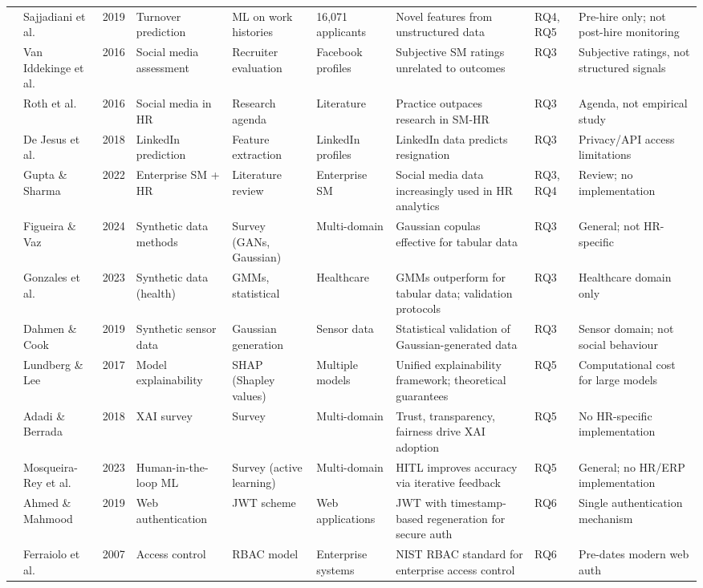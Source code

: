 \documentclass[12pt,a4paper]{article}
\begin{document}
\begin{landscape}
\begin{longtable}{C{0.4cm} L{2.0cm} C{0.6cm} L{1.8cm} L{2.2cm} L{1.8cm} L{2.8cm} C{0.9cm} L{2.8cm}}
 & Sajjadiani et al. & 2019 & Turnover prediction & ML on work histories & 16,071 applicants & Novel features from unstructured data & RQ4, RQ5 & Pre-hire only; not post-hire monitoring \\
 & Van Iddekinge et al. & 2016 & Social media assessment & Recruiter evaluation & Facebook profiles & Subjective SM ratings unrelated to outcomes & RQ3 & Subjective ratings, not structured signals \\
 & Roth et al. & 2016 & Social media in HR & Research agenda & Literature & Practice outpaces research in SM-HR & RQ3 & Agenda, not empirical study \\
 & De Jesus et al. & 2018 & LinkedIn prediction & Feature extraction & LinkedIn profiles & LinkedIn data predicts resignation & RQ3 & Privacy/API access limitations \\
 & Gupta \& Sharma & 2022 & Enterprise SM + HR & Literature review & Enterprise SM & Social media data increasingly used in HR analytics & RQ3, RQ4 & Review; no implementation \\
 & Figueira \& Vaz & 2024 & Synthetic data methods & Survey (GANs, Gaussian) & Multi-domain & Gaussian copulas effective for tabular data & RQ3 & General; not HR-specific \\
 & Gonzales et al. & 2023 & Synthetic data (health) & GMMs, statistical & Healthcare & GMMs outperform for tabular data; validation protocols & RQ3 & Healthcare domain only \\
 & Dahmen \& Cook & 2019 & Synthetic sensor data & Gaussian generation & Sensor data & Statistical validation of Gaussian-generated data & RQ3 & Sensor domain; not social behaviour \\
 & Lundberg \& Lee & 2017 & Model explainability & SHAP (Shapley values) & Multiple models & Unified explainability framework; theoretical guarantees & RQ5 & Computational cost for large models \\
 & Adadi \& Berrada & 2018 & XAI survey & Survey & Multi-domain & Trust, transparency, fairness drive XAI adoption & RQ5 & No HR-specific implementation \\
 & Mosqueira-Rey et al. & 2023 & Human-in-the-loop ML & Survey (active learning) & Multi-domain & HITL improves accuracy via iterative feedback & RQ5 & General; no HR/ERP implementation \\
 & Ahmed \& Mahmood & 2019 & Web authentication & JWT scheme & Web applications & JWT with timestamp-based regeneration for secure auth & RQ6 & Single authentication mechanism \\
 & Ferraiolo et al. & 2007 & Access control & RBAC model & Enterprise systems & NIST RBAC standard for enterprise access control & RQ6 & Pre-dates modern web auth \\

\end{longtable}
\end{landscape}
\end{document}
